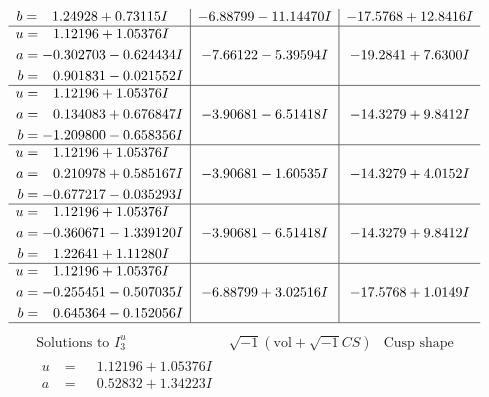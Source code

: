 \documentclass[1p]{elsarticle_modified}
\theoremstyle{definition}
\newcommand{\I}{\sqrt{-1}}
\begin{document}
$$\begin{array}{c|c|c}
\begin{aligned}
b &= \phantom{-}1.24928 + 0.73115 I\end{aligned}
 & -6.88799 - 11.14470 I & -17.5768 + 12.8416 I \\ \hline\begin{aligned}
u &= \phantom{-}1.12196 + 1.05376 I \\
a &= -0.302703 - 0.624434 I \\
b &= \phantom{-}0.901831 - 0.021552 I\end{aligned}
 & -7.66122 - 5.39594 I & -19.2841 + 7.6300 I \\ \hline\begin{aligned}
u &= \phantom{-}1.12196 + 1.05376 I \\
a &= \phantom{-}0.134083 + 0.676847 I \\
b &= -1.209800 - 0.658356 I\end{aligned}
 & -3.90681 - 6.51418 I & -14.3279 + 9.8412 I \\ \hline\begin{aligned}
u &= \phantom{-}1.12196 + 1.05376 I \\
a &= \phantom{-}0.210978 + 0.585167 I \\
b &= -0.677217 - 0.035293 I\end{aligned}
 & -3.90681 - 1.60535 I & -14.3279 + 4.0152 I \\ \hline\begin{aligned}
u &= \phantom{-}1.12196 + 1.05376 I \\
a &= -0.360671 - 1.339120 I \\
b &= \phantom{-}1.22641 + 1.11280 I\end{aligned}
 & -3.90681 - 6.51418 I & -14.3279 + 9.8412 I \\ \hline\begin{aligned}
u &= \phantom{-}1.12196 + 1.05376 I \\
a &= -0.255451 - 0.507035 I \\
b &= \phantom{-}0.645364 - 0.152056 I\end{aligned}
 & -6.88799 + 3.02516 I & -17.5768 + 1.0149 I\\
 \hline 
 \end{array}$$\newpage$$\begin{array}{c|c|c}  
\text{Solutions to }I^u_{3}& \I (\text{vol} + \sqrt{-1}CS) & \text{Cusp shape}\\
 \hline 
\begin{aligned}
u &= \phantom{-}1.12196 + 1.05376 I \\
a &= \phantom{-}0.52832 + 1.34223 I \\

\end{aligned}
\end{array}$$
\end{document}
